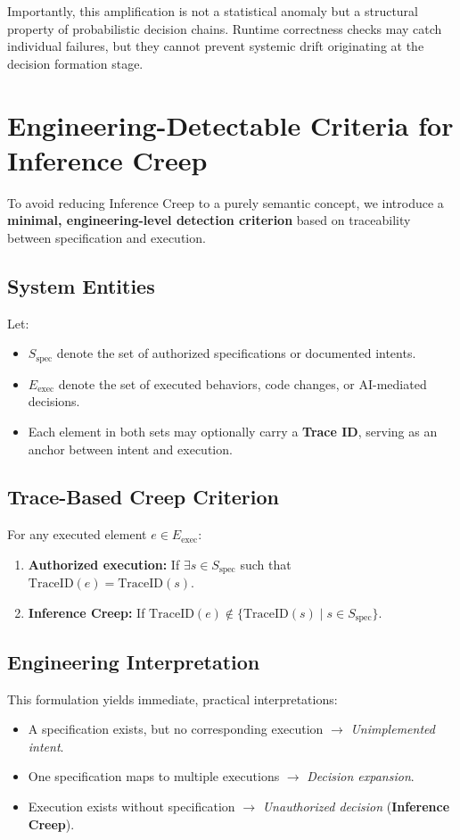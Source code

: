 \documentclass[11pt, a4paper]{article}
\providecommand{\tightlist}{%
  \setlength{\itemsep}{0pt}\setlength{\parskip}{0pt}}
\begin{document}
Importantly, this amplification is not a statistical anomaly but a structural property of probabilistic decision chains. Runtime correctness checks may catch individual failures, but they cannot prevent systemic drift originating at the decision formation stage.

\section{Engineering-Detectable Criteria for Inference Creep}
To avoid reducing Inference Creep to a purely semantic concept, we introduce a \textbf{minimal, engineering-level detection criterion} based on traceability between specification and execution.

\subsection{System Entities}
Let:
\begin{itemize}
\tightlist
\item $S_{\text{spec}}$ denote the set of authorized specifications or documented intents.
\item $E_{\text{exec}}$ denote the set of executed behaviors, code changes, or AI-mediated decisions.
\item Each element in both sets may optionally carry a \textbf{Trace ID}, serving as an anchor between intent and execution.
\end{itemize}

\subsection{Trace-Based Creep Criterion}
For any executed element $e \in E_{\text{exec}}$:
\begin{enumerate}
    \item \textbf{Authorized execution:} If $\exists s \in S_{\text{spec}}$ such that $\text{TraceID}(e) = \text{TraceID}(s)$.
    \item \textbf{Inference Creep:} If $\text{TraceID}(e) \notin \{ \text{TraceID}(s) \mid s \in S_{\text{spec}} \}$.
\end{enumerate}



\subsection{Engineering Interpretation}
This formulation yields immediate, practical interpretations:
\begin{itemize}
\tightlist
\item A specification exists, but no corresponding execution $\rightarrow$ \textit{Unimplemented intent}.
\item One specification maps to multiple executions $\rightarrow$ \textit{Decision expansion}.
\item Execution exists without specification $\rightarrow$ \textit{Unauthorized decision} (\textbf{Inference Creep}).
\end{itemize}
\end{document}
